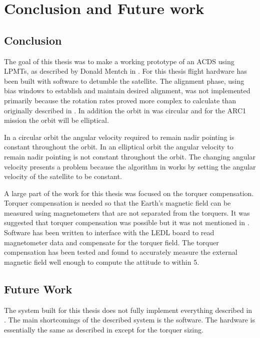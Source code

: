
\chapter{Conclusion and Future work}

\section{Conclusion}

The goal of this thesis was to make a working prototype of an \ac{ACDS} using \acp{LPMT}, as described by Donald Mentch in \cite{Mentch11}. For this thesis flight hardware has been built with software to detumble the satellite. The alignment phase, using bias windows to establish and maintain desired alignment, was not implemented primarily because the rotation rates proved more complex to calculate than originally described in \cite{Mentch11}. In addition the orbit in \cite{Mentch11} was circular and for the \ac{ARC}1 mission the orbit will be elliptical.

In a circular orbit the angular velocity required to remain nadir pointing is constant throughout the orbit. In an elliptical orbit the angular velocity to remain nadir pointing is not constant throughout the orbit. The changing angular velocity presents a problem because the algorithm in \cite{Mentch11} works by setting the angular velocity of the satellite to be constant. 

A large part of the work for this thesis was focused on the torquer compensation. Torquer compensation is needed so that the Earth's magnetic field can be measured using magnetometers that are not separated from the torquers. It was suggested that torquer compensation was possible but it was not mentioned in \cite{Mentch11}. Software has been written to interface with the \ac{LEDL} board to read magnetometer data and compensate for the torquer field. The torquer compensation has been tested and found to accurately measure the external magnetic field well enough to compute the attitude to within \textpm{}5\textdegree.

\section{Future Work}

\label{sec:future-work}

The system built for this thesis does not fully implement everything described in \cite{Mentch11}. The main shortcomings of the described system is the software. The hardware is essentially the same as described in \cite{Mentch11} except for the torquer sizing.

